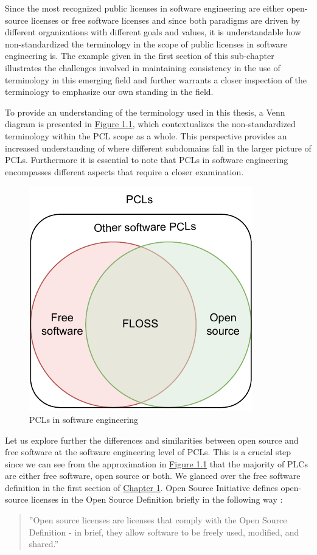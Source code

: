 Since the most recognized public licenses in software engineering are either open-source licenses or free software licenses and since both paradigms are driven by different organizations with different goals and values, it is understandable how non-standardized the terminology in the scope of public licenses in software engineering is. The example given in the first section of this sub-chapter illustrates the challenges involved in maintaining consistency in the use of terminology in this emerging field and further warrants a closer inspection of the terminology to emphasize our own standing in the field.

To provide an understanding of the terminology used in this thesis, a Venn diagram is presented in \hyperref[fig:terms]{Figure 1.1}, which contextualizes the non-standardized terminology within the PCL scope as a whole. This perspective provides an increased understanding of where different subdomains fall in the larger picture of PCLs. Furthermore it is essential to note that PCLs in software engineering encompasses different aspects that require a closer examination.

\begin{figure}[t]
	\centering
	\includegraphics[scale=1.5]{figures/terms-diagram.pdf}
	\caption{PCLs in software engineering}
	\label{fig:terms}
\end{figure}

Let us explore further the differences and similarities between open source and free software at the software engineering level of PCLs. This is a crucial step since we can see from the approximation in \hyperref[fig:terms]{Figure 1.1} that the majority of PLCs are either free software, open source or both. We glanced over the free software definition in the first section of \hyperref[intro]{Chapter 1}. Open Source Initiative defines open-source licenses in the Open Source Definition briefly in the following way \citep{osi:licenselist}:
\begin{quote}
	''Open source licenses are licenses that comply with the Open Source Definition - in brief, they allow software to be freely used, modified, and shared.''
\end{quote}

